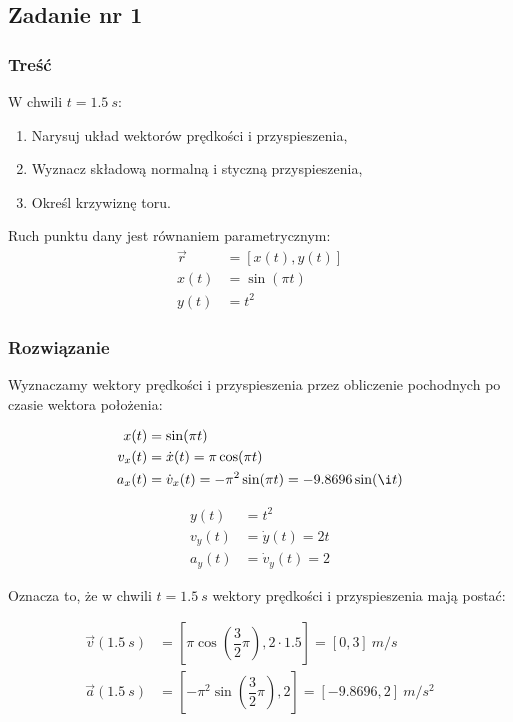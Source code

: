 \subsection{Zadanie nr 1}

\subsubsection*{Treść}

W chwili $t = \SI{1.5}{s}$:
\begin{enumerate}
    \item Narysuj układ wektorów prędkości i przyspieszenia,
    \item Wyznacz składową normalną i styczną przyspieszenia,
    \item Określ krzywiznę toru.
\end{enumerate}

Ruch punktu dany jest równaniem parametrycznym:
\begin{align*}
    \Vec{r} &= [ x(t), y(t) ] \\
    x(t) &= \sin(\pi t) \\
    y(t) &= t^2
\end{align*}

\subsubsection*{Rozwiązanie}

Wyznaczamy wektory prędkości i przyspieszenia przez obliczenie pochodnych po czasie wektora położenia:

\begin{align*}
    x(t) &= \sin(\pi t) \\
    v_x(t) &= \dot x(t) = \pi \cos(\pi t) \\
    a_x(t) &= \dot v_x(t) = - \pi^2 \sin(\pi t) = -9.8696 \sin(\i t)
\end{align*}

\begin{align*}
    y(t) &= t^2 \\
    v_y(t) &= \dot y(t) = 2t \\
    a_y(t) &= \dot v_y(t) = 2
\end{align*}

Oznacza to, że w chwili $t = \SI{1.5}{s}$ wektory prędkości i przyspieszenia mają postać:

\begin{align*}
    \vec v(\SI{1.5}{s}) &= \left[ \pi \cos\left( \dfrac{3}{2} \pi \right), 2 \cdot 1.5 \right] = [0, 3] \ \si{m/s} \\
    \vec a(\SI{1.5}{s}) &= \left[ -\pi^2 \sin\left( \dfrac{3}{2} \pi \right), 2 \right] = [ -9.8696, 2] \ \si{m/s^2}
\end{align*}

